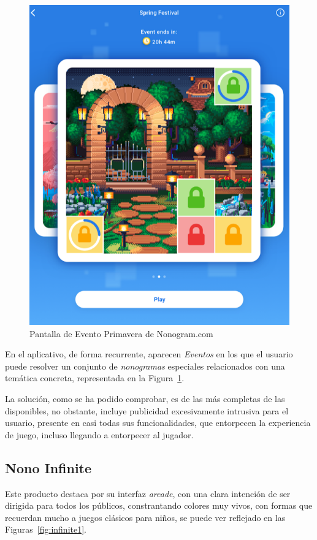 \begin{figure}[H]
   \centering
   \includegraphics[scale=.25]{images/picturecross3.png}
   \caption{Pantalla de Evento Primavera de Nonogram.com}
   \label{fig:picture2}
 \end{figure}

En el aplicativo, de forma recurrente, aparecen \textit{Eventos} en los que el usuario puede resolver un conjunto de \textit{nonogramas} especiales relacionados
con una temática concreta, representada en la Figura~\ref{fig:picture2}.
 
La solución, como se ha podido comprobar, es de las más completas de las disponibles, no obstante, incluye publicidad excesivamente intrusiva para el usuario,
presente en casi todas sus funcionalidades, que entorpecen la experiencia de juego, incluso llegando a entorpecer al jugador.

\subsection{Nono Infinite}
Este producto destaca por su interfaz \textit{arcade}, con una clara intención de ser dirigida para todos los públicos, constrantando colores muy vivos,
con formas que recuerdan mucho a juegos clásicos para niños, se puede ver reflejado en las Figuras~\ref{fig:infinite1}.

